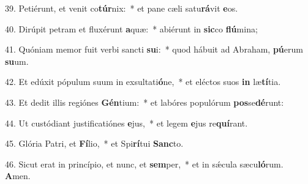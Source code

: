 39. Petiérunt, et venit co\textbf{túr}nix:~*  et pane cæli satu\textbf{rá}vit \textbf{e}os.\

40. Dirúpit petram et fluxérunt \textbf{a}quæ:~*  abiérunt in \textbf{sic}co \textbf{flú}mina;\

41. Quóniam memor fuit verbi sancti \textbf{su}i:~*  quod hábuit ad Abraham, \textbf{pú}erum \textbf{su}um.\

42. Et edúxit pópulum suum in exsultati\textbf{ó}ne,~*  et eléctos suos \textbf{in} læ\textbf{tí}tia.\

43. Et dedit illis regiónes \textbf{Gén}tium:~*  et labóres populórum \textbf{pos}se\textbf{dé}runt:\

44. Ut custódiant justificatiónes \textbf{e}jus,~*  et legem \textbf{e}jus re\textbf{quí}rant.\

45. Glória Patri, et \textbf{Fí}lio,~*  et Spi\textbf{rí}tui \textbf{Sanc}to.\

46. Sicut erat in princípio, et nunc, et \textbf{sem}per,~*  et in sǽcula sæcu\textbf{ló}rum. \textbf{A}men.\

